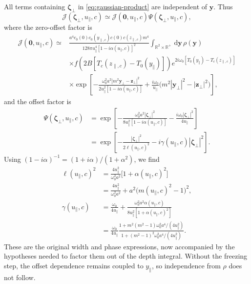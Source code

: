 \documentclass[11pt]{article}
\newcommand{\R}{\mathbb{R}}
\newcommand{\by}{\bm{y}}
\newcommand{\bz}{\bm{z}}
\newcommand{\bzeta}{\boldsymbol{\zeta}}
\newcommand{\dd}{\,\mathrm{d}}
\begin{document}
All terms containing $\bzeta_\perp$ in
\eqref{eq:gaussian-product} are independent of $\by$. Thus
\begin{equation}
\mathcal J(\bzeta_\perp,u_\parallel,c)
\simeq\mathcal J(\mathbf 0,u_\parallel,c)
\Psi(\bzeta_\perp,u_\parallel,c),
\label{eq:factor-point}
\end{equation}
where the zero-offset factor is
\begin{align}
\mathcal J(\mathbf0,u_\parallel,c)
\simeq{}&\frac{a^4c_0(0)c_0(y_{\parallel,c})c(0)c(z_{\parallel,c})m^4}
{128\pi u_\parallel^4[1-i\alpha(u_\parallel,c)]^2}
\int_{\R^2\times\R^+}\dd\by\,\rho(\by)
\nonumber\\
&\times f\!\left(2B[T_c(z_{\parallel,c})-T_0(y_\parallel)]\right)
e^{2i\omega_0[T_0(y_\parallel)-T_c(z_{\parallel,c})]}
\nonumber\\
&\times\exp\!\left[
-\frac{\omega_0^2a^2|m^2\by_\perp-\bz_\perp|^2}
{2u_\parallel^2[1-i\alpha(u_\parallel,c)]}
+\frac{i\omega_0}{u_\parallel}
\big(m^2|\by_\perp|^2-|\bz_\perp|^2\big)\right],
\label{eq:J0-point}
\end{align}
and the offset factor is
\begin{align}
\Psi(\bzeta_\perp,u_\parallel,c)
&=\exp\!\left[
-\frac{\omega_0^2a^2|\bzeta_\perp|^2}
{8u_\parallel^2[1-i\alpha(u_\parallel,c)]}
-\frac{i\omega_0|\bzeta_\perp|^2}{4u_\parallel}\right]
\label{eq:Psi-complex}\\
&=\exp\!\left[-\frac{|\bzeta_\perp|^2}{2\ell(u_\parallel,c)^2}
-i\gamma(u_\parallel,c)|\bzeta_\perp|^2\right].
\label{eq:Psi-point}
\end{align}
Using $(1-i\alpha)^{-1}=(1+i\alpha)/(1+\alpha^2)$, we find
\begin{align}
\ell(u_\parallel,c)^2
&=\frac{4u_\parallel^2}{\omega_0^2a^2}
\big[1+\alpha(u_\parallel,c)^2\big]
\nonumber\\
&=\frac{4u_\parallel^2}{\omega_0^2a^2}
+a^2\big(m(u_\parallel,c)^2-1\big)^2,
\label{eq:ell-point}\\
\gamma(u_\parallel,c)
&=\frac{\omega_0}{4u_\parallel}
+\frac{\omega_0^2a^2\alpha(u_\parallel,c)}
{8u_\parallel^2[1+\alpha(u_\parallel,c)^2]}
\nonumber\\
&=\frac{\omega_0}{4u_\parallel}
\frac{1+m^2(m^2-1)\omega_0^2a^4/(4u_\parallel^2)}
{1+(m^2-1)^2\omega_0^2a^4/(4u_\parallel^2)}.
\label{eq:gamma-point}
\end{align}
These are the original width and phase expressions, now accompanied by
the hypotheses needed to factor them out of the depth integral.
Without the freezing step, the offset dependence remains coupled to
$y_\parallel$, so independence from $\rho$ does not follow.
\end{document}
